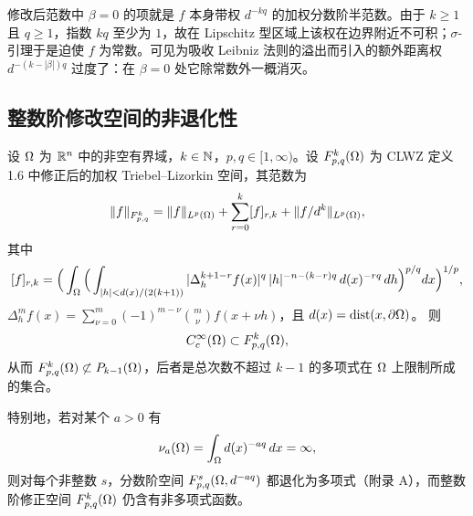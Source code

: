 \begin{remark}[直觉]
修改后范数中 $\beta=0$ 的项就是 $f$ 本身带权 $d^{-kq}$ 的加权分数阶半范数。由于 $k\ge1$ 且 $q\ge1$，指数 $kq$ 至少为 $1$，故在 Lipschitz 型区域上该权在边界附近不可积；$\sigma$-引理于是迫使 $f$ 为常数。可见为吸收 Leibniz 法则的溢出而引入的额外距离权 $d^{-(k-|\beta|)q}$ 过度了：在 $\beta=0$ 处它除常数外一概消灭。
\end{remark}

\subsection{整数阶修改空间的非退化性}

\begin{theorem}
\label{thm:int-nondegen}
设 $\Omega$ 为 $\mathbb{R}^n$ 中的非空有界域，$k\in\mathbb{N}$，$p,q\in[1,\infty)$。设 $F^k_{p,q}(\Omega)$ 为 CLWZ 定义 1.6 中修正后的加权 Triebel--Lizorkin 空间，其范数为
\[
  \|f\|_{F^k_{p,q}}=\|f\|_{L^p(\Omega)}+\sum_{r=0}^k[f]_{r,k}+\|f/d^k\|_{L^p(\Omega)},
\]
其中
\[
  [f]_{r,k}=\Big(\int_\Omega\Big(\int_{|h|<d(x)/(2(k+1))}|\Delta_h^{k+1-r}f(x)|^q\,|h|^{-n-(k-r)q}\,d(x)^{-rq}\,dh\Big)^{p/q}dx\Big)^{1/p},
\]
$\Delta_h^m f(x)=\sum_{\nu=0}^m(-1)^{m-\nu}\binom{m}{\nu}f(x+\nu h)$，且 $d(x)=\operatorname{dist}(x,\partial\Omega)$。
则
\[
  C_c^\infty(\Omega)\subset F^k_{p,q}(\Omega),
\]
从而 $F^k_{p,q}(\Omega)\not\subset P_{k-1}(\Omega)$，后者是总次数不超过 $k-1$ 的多项式在 $\Omega$ 上限制所成的集合。

特别地，若对某个 $a>0$ 有
\[
  \nu_{a}(\Omega)=\int_\Omega d(x)^{-aq}\,dx=\infty ,
\]
则对每个非整数 $s$，分数阶空间 $F^{s}_{p,q}(\Omega,d^{-aq})$ 都退化为多项式（附录 A），而整数阶修正空间 $F^k_{p,q}(\Omega)$ 仍含有非多项式函数。
\end{theorem}

